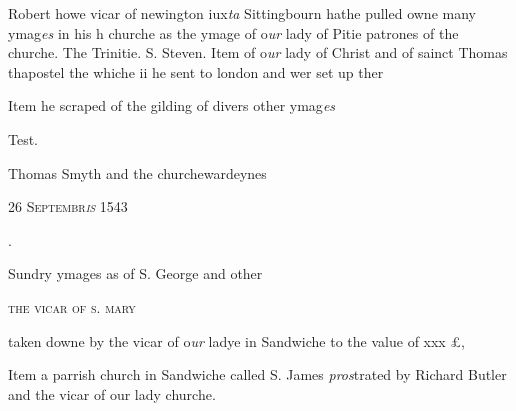 \documentclass[12pt, a4paper]{book}
\begin{document}
	
		
			
		
		\ifthenelse{\isodd{\thepage}}
		{\reversemarginpar}
		{\normalmarginpar}
		Robert howe vicar of newington iux\textit{ta} Sittingbourn
  hathe pulled owne many ymag\textit{es} in his h churche
 as the ymage of o\textit{ur} lady of Pitie patrones of the
 churche. The Trinitie. S. Steven. Item of
 o\textit{ur} lady of Christ and of sainct Thomas thapostel
 the whiche ii he sent to london and wer set up ther
		

		\ifthenelse{\isodd{\thepage}}
		{\reversemarginpar}
		{\normalmarginpar}
		Item he scraped of the gilding of divers other ymag\textit{es}

		\ifthenelse{\isodd{\thepage}}
		{\reversemarginpar}
		{\normalmarginpar}
		Test.
 
		\ifthenelse{\isodd{\thepage}}
		{\reversemarginpar}
		{\normalmarginpar}
		Thomas Smyth and the churchewardeynes
 

            
            
               
				\begin{center} \begin{large} {\scshape 
                  26 Septembr\textit{is} 1543
               } \end{large} \end{center}
			
.
 
 	
				\marginpar[\vspace{0.5cm}{\textcolor{Gray}{Saint Mary of Sandwiche}}]{}
			
 	
		\ifthenelse{\isodd{\thepage}}
		{\reversemarginpar}
		{\normalmarginpar}
		Sundry ymages as of S. George and other
 

                  
				\begin{center}  {\scshape the vicar of s. mary}  \end{center}
			
	
		\ifthenelse{\isodd{\thepage}}
		{\reversemarginpar}
		{\normalmarginpar}
		taken downe by the vicar of o\textit{ur }ladye in Sandwiche
 to the value of xxx £,

	
			
	
		\ifthenelse{\isodd{\thepage}}
		{\reversemarginpar}
		{\normalmarginpar}
		Item a parrish church in Sandwiche called S. James
 \textit{pros}trated by Richard Butler and the vicar of our
 lady churche.
\end{document}
